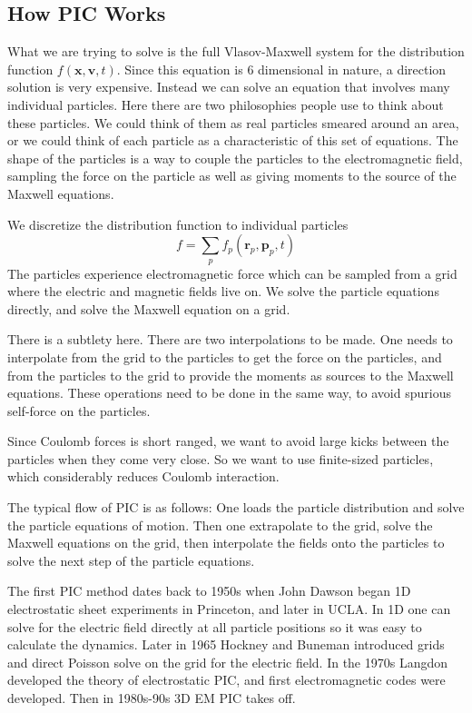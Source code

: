 \documentclass[letterpaper, 11pt]{article}
\numberwithin{equation}{section}
\numberwithin{figure}{section}
\begin{document}
\subsection{How PIC Works}

What we are trying to solve is the full Vlasov-Maxwell system for the
distribution function $f(\mathbf{x}, \mathbf{v}, t)$. Since this equation is 6
dimensional in nature, a direction solution is very expensive. Instead we can
solve an equation that involves many individual particles. Here there are two
philosophies people use to think about these particles. We could think of them
as real particles smeared around an area, or we could think of each particle as
a characteristic of this set of equations. The shape of the particles is a way
to couple the particles to the electromagnetic field, sampling the force on the
particle as well as giving moments to the source of the Maxwell equations.

We discretize the distribution function to individual particles
\begin{equation}
  \label{eq:2}
  f = \sum_p f_p(\mathbf{r}_p, \mathbf{p}_p, t)
\end{equation}
The particles experience electromagnetic force which can be sampled from a grid
where the electric and magnetic fields live on. We solve the particle equations
directly, and solve the Maxwell equation on a grid.

There is a subtlety here. There are two interpolations to be made. One needs to
interpolate from the grid to the particles to get the force on the particles,
and from the particles to the grid to provide the moments as sources to the
Maxwell equations. These operations need to be done in the same way, to avoid
spurious self-force on the particles.

Since Coulomb forces is short ranged, we want to avoid large kicks between the
particles when they come very close. So we want to use finite-sized particles,
which considerably reduces Coulomb interaction.

The typical flow of PIC is as follows: One loads the particle distribution and
solve the particle equations of motion. Then one extrapolate to the grid, solve
the Maxwell equations on the grid, then interpolate the fields onto the
particles to solve the next step of the particle equations.

The first PIC method dates back to 1950s when John Dawson began 1D electrostatic
sheet experiments in Princeton, and later in UCLA. In 1D one can solve for the
electric field directly at all particle positions so it was easy to calculate
the dynamics. Later in 1965 Hockney and Buneman introduced grids and direct
Poisson solve on the grid for the electric field. In the 1970s Langdon developed
the theory of electrostatic PIC, and first electromagnetic codes were developed.
Then in 1980s-90s 3D EM PIC takes off.
\end{document}
